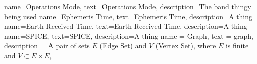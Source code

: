{
    name={Operations Mode},
    text={Operations Mode},
    description={The band thingy being used}
}
{
    name={Ephemeris Time},
    text={Ephemeris Time},
    description={A thing}
}
{
    name={Earth Received Time},
    text={Earth Received Time},
    description={A thing}
}
{
    name={SPICE},
    text={SPICE},
    description={A thing}
}
{
    name = {Graph},
    text = {graph},
    description = {A pair of sets $E$ (Edge Set) and $V$ (Vertex Set), where $E$ is finite and $V\subset E\times E$},
}